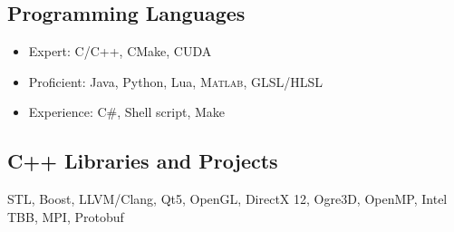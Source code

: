 \subsection{Programming Languages}
\begin{itemize}
\item Expert: C/C++, CMake, CUDA
\item Proficient: Java, Python, Lua, \textsc{Matlab}, GLSL/HLSL
\item Experience: C\#, Shell script, Make
\end{itemize}

\subsection{C++ Libraries and Projects}
STL, Boost, LLVM/Clang, Qt5, OpenGL, DirectX 12, Ogre3D, OpenMP, Intel TBB, MPI, Protobuf

